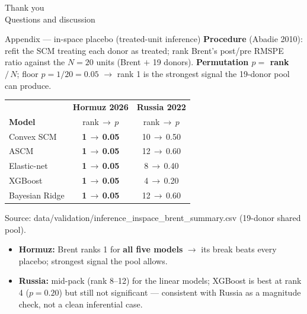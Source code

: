 \documentclass[aspectratio=169,11pt]{beamer}
\newcommand{\src}[1]{{\footnotesize\textcolor{muted}{(#1)}}}
\newcommand{\smalltext}[1]{{\footnotesize\textcolor{muted}{#1}}}
\newcommand{\hd}[1]{\textbf{#1}}
\begin{document}
{
\begin{frame}[plain]
  \vfill
  \begin{center}
    {\Large Thank you}\\[1em]
    {\normalsize Questions and discussion}\\[2em]

  \end{center}
  \vfill
\end{frame}
}

\begin{frame}{Appendix --- in-space placebo (treated-unit inference)}
  \footnotesize
  \hd{Procedure} \src{Abadie 2010}: refit the SCM treating each donor as treated; rank Brent's post/pre RMSPE
  ratio against the $N{=}20$ units (Brent $+$ 19 donors). \hd{Permutation $p = $ rank $/\,N$}; floor $p = 1/20 = 0.05$
  $\rightarrow$ rank 1 is the strongest signal the 19-donor pool can produce.

  \vspace{0.4em}
  \begin{center}
  \begin{tabular}{@{}l c c@{}}
    \toprule
                   & \hd{Hormuz 2026} & \hd{Russia 2022} \\
    \hd{Model}     & rank\,$\rightarrow$\,$p$ & rank\,$\rightarrow$\,$p$ \\
    \midrule
    Convex SCM     & \textbf{1\,$\rightarrow$\,0.05} & 10\,$\rightarrow$\,0.50 \\
    ASCM           & \textbf{1\,$\rightarrow$\,0.05} & 12\,$\rightarrow$\,0.60 \\
    Elastic-net    & \textbf{1\,$\rightarrow$\,0.05} & 8\,$\rightarrow$\,0.40  \\
    XGBoost        & \textbf{1\,$\rightarrow$\,0.05} & 4\,$\rightarrow$\,0.20  \\
    Bayesian Ridge & \textbf{1\,$\rightarrow$\,0.05} & 12\,$\rightarrow$\,0.60 \\
    \bottomrule
  \end{tabular}
  \end{center}
  \smalltext{Source: data/validation/inference\_inspace\_brent\_summary.csv (19-donor shared pool).}

  \vspace{0.4em}
  \begin{itemize}\setlength\itemsep{0.05em}
    \item \hd{Hormuz:} Brent ranks 1 for \hd{all five models} $\rightarrow$ its break beats every placebo; strongest signal the pool allows.
    \item \hd{Russia:} mid-pack (rank 8--12) for the linear models; XGBoost is best at rank 4 ($p{=}0.20$) but still not significant --- consistent with Russia as a magnitude check, not a clean inferential case.
  \end{itemize}
\end{frame}
\end{document}
